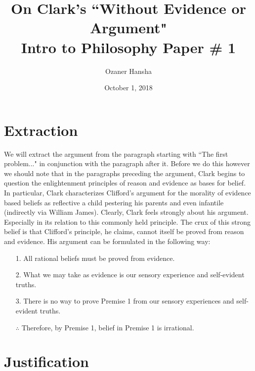 \documentclass{article}
\begin{document}
\title{%
  On Clark's ``Without Evidence or Argument" \\
  \large Intro to Philosophy Paper \# 1}
\author{Ozaner Hansha}
\date{October 1, 2018}
\maketitle


\section{Extraction}
We will extract the argument from the paragraph starting with ``The first problem..." in conjunction with the paragraph after it. Before we do this however we should note that in the paragraphs preceding the argument, Clark begins to question the enlightenment principles of reason and evidence as bases for belief. In particular, Clark characterizes Clifford's argument for the morality of evidence based beliefs as reflective a child pestering his parents and even infantile (indirectly via William James). Clearly, Clark feels strongly about his argument. Especially in its relation to this commonly held principle. The crux of this strong belief is that Clifford's principle, he claims, cannot itself be proved from reason and evidence. His argument can be formulated in the following way:

\begin{itemize}
    \item[1.] All rational beliefs must be proved from evidence.
    \item[2.] What we may take as evidence is our sensory experience and self-evident truths.
    \item[3.] There is no way to prove Premise 1 from our sensory experiences and self-evident truths.
    \item[$\therefore$] Therefore, by Premise 1, belief in Premise 1 is irrational.
\end{itemize}

\section{Justification}
\end{document}
